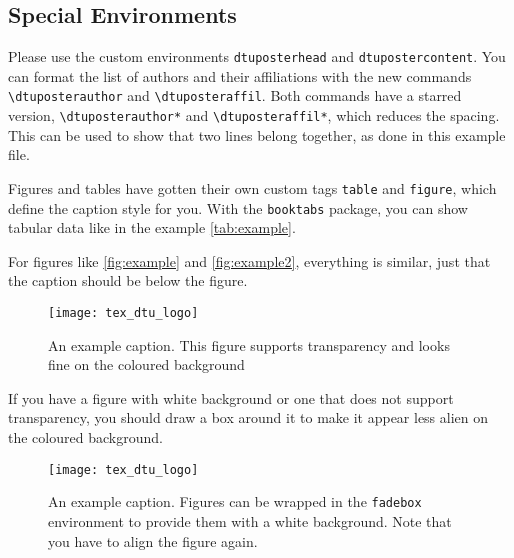 \documentclass[
   ,highlight = dtublue
   ,toplogo   = {{tex_dtu_electro_b_uk}}
   ,botlogo   = {{DG_logo_CMYK_red-cropped}}
   ,toprightlogo = {{DTU-logo-blue-cmyk}}
   ,papersize = {{a0paper}}
   ,colcount  = {{2columns}}
   ,nocrop
]{dtuposter}
\begin{document}
\begin{dtupostercontent}
\section{Special Environments}
Please use the custom environments \texttt{dtuposterhead} and 
\texttt{dtupostercontent}. You can format the list of authors and 
their affiliations with the new commands \texttt{\textbackslash dtuposterauthor}
and \texttt{\textbackslash dtuposteraffil}. Both commands have a starred version, 
\texttt{\textbackslash dtuposterauthor*} and \texttt{\textbackslash dtuposteraffil*}, 
which reduces the spacing. This can be used to show that two lines belong together, as
done in this example file.

Figures and tables have gotten their own custom tags \texttt{table} and 
\texttt{figure}, which define the caption style for you. With the \texttt{booktabs}
package, you can show tabular data like in the example \autoref{tab:example}.

For figures like \autoref{fig:example} and \autoref{fig:example2}, everything is 
similar, just that the caption should be below the figure. 

\begin{figure}
\texttt{[image: tex\_dtu\_logo]}
\caption{An example caption. This figure supports transparency and looks fine on 
the coloured background}\label{fig:example}
\end{figure}

If you have a figure with white background or one that does not support transparency,
you should draw a box around it to make it appear less alien on the coloured background.

\begin{figure}
  \begin{fadebox}\begin{center}
    \texttt{[image: tex\_dtu\_logo]}
  \end{center}\end{fadebox}
  \caption{An example caption. Figures can be wrapped in the \texttt{fadebox} 
environment to provide them with a white background. Note that you have to align the 
figure again.}\label{fig:example2}
\end{figure}

\end{dtupostercontent}
\end{document}
